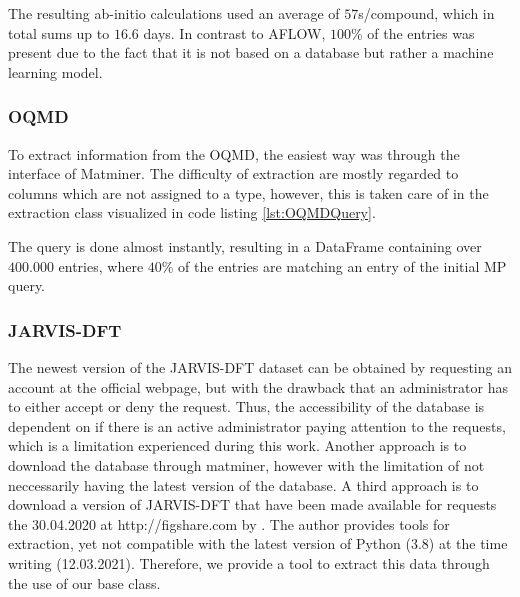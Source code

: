 The resulting ab-initio calculations used an average of $57$s/compound, which in total sums up to $16.6$ days. In contrast to AFLOW, $100\%$ of the entries was present due to the fact that it is not based on a database but rather a machine learning model.

\subsubsection{OQMD}

To extract information from the OQMD, the easiest way was through the interface of Matminer. The difficulty of extraction are mostly regarded to columns which are not assigned to a type, however, this is taken care of in the extraction class visualized in code listing \autoref{lst:OQMDQuery}.



The query is done almost instantly, resulting in a DataFrame containing over $400.000$ entries, where $40$\% of the entries are matching an entry of the initial MP query.

\subsubsection{JARVIS-DFT}

The newest version of the JARVIS-DFT dataset can be obtained by requesting an account at the official webpage, but with the drawback that an administrator has to either accept or deny the request. Thus, the accessibility of the database is dependent on if there is an active administrator paying attention to the requests, which is a limitation experienced during this work. Another approach is to download the database through matminer, however with the limitation of not neccessarily having the latest version of the database. A third approach is to download a version of JARVIS-DFT that have been made available for requests the 30.04.2020 at http://figshare.com by \citeauthor{Choudhary2020} \cite{Choudhary2020}. The author provides tools for extraction, yet not compatible with the latest version of Python (3.8) at the time writing (12.03.2021). Therefore, we provide a tool to extract this data through the use of our base class.




